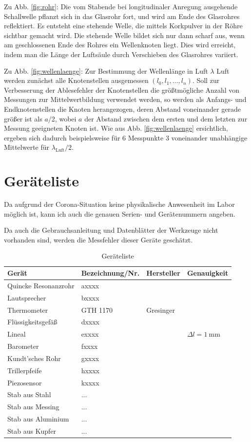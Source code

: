 \documentclass{article}
\begin{document}
Zu Abb. \ref{fig:rohr}: Die vom Stabende bei longitudinaler Anregung ausgehende Schallwelle pflanzt sich in das Glasrohr fort, und wird am Ende des Glasrohres reflektiert. Es entsteht eine stehende
Welle, die mittels Korkpulver in der Röhre sichtbar gemacht wird. Die stehende Welle bildet
sich nur dann scharf aus, wenn am geschlossenen Ende des Rohres ein Wellenknoten liegt. Dies
wird erreicht, indem man die Länge der Luftsäule durch Verschieben des Glasrohres variiert.


Zu Abb. \ref{fig:wellenlaenge}: Zur Bestimmung der Wellenlänge in Luft $\lambda$ Luft werden zunächst alle Knotenstellen ausgemessen $(l_0, l_1, \dots, l_n)$. Soll zur Verbesserung der Ablesefehler der Knotenstellen die größtmögliche Anzahl von Messungen zur Mittelwertbildung verwendet werden, so werden als
Anfangs- und Endknotenstellen die Knoten herangezogen, deren Abstand voneinander gerade größer ist als $a$/2, wobei $a$ der Abstand zwischen dem ersten und dem letzten zur Messung geeigneten Knoten ist. Wie aus Abb. \ref{fig:wellenlaenge} ersichtlich, ergeben sich dadurch beispielsweise für 6 Messpunkte 3 voneinander unabhängige Mittelwerte für $\lambda_\text{Luft}/2$.

\newpage

\section{Geräteliste}


Da aufgrund der Corona-Situation keine physikalische Anwesenheit im Labor möglich ist, kann ich auch die genauen Serien- und Gerätenummern angeben.

Da auch die Gebrauchsanleitung und Datenblätter der Werkzeuge nicht vorhanden sind, werden die Messfehler dieser Geräte geschätzt.


\begin{table}[h]
\caption{Geräteliste}

\begin{tabular}{llll}
Gerät  & Bezeichnung/Nr. & Hersteller & Genauigkeit \\
\hline
Quincke Resonanzrohr & axxxx \\
Lautsprecher & bxxxx \\
Thermometer & GTH 1170 & Gresinger &  \\
Flüssigkeitsgefäß & dxxxx \\
Lineal & exxxx  & & $\Delta l = 1~$mm \\
Barometer & fxxxx \\
Kundt'sches Rohr & gxxxx \\
Trillerpfeife & hxxxx\\
Piezosensor & kxxxx\\
Stab aus Stahl & ... \\
Stab aus Messing & ... \\
Stab aus Aluminium & ... \\
Stab aus Kupfer & ... 
\end{tabular}
\end{table}
\end{document}
